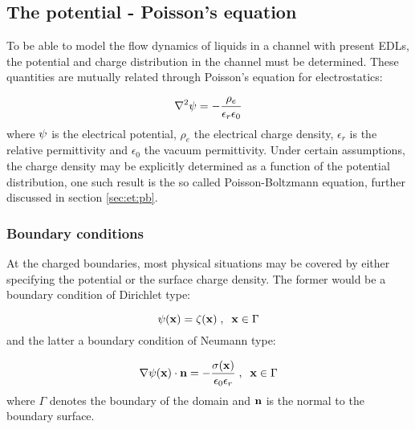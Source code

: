 \subsection{The potential - Poisson's equation}\label{sec:et:poisson}
To be able to model the flow dynamics of liquids in a channel with
present EDLs, the potential and charge distribution
in the channel must be determined. These quantities are mutually
related through Poisson's equation for electrostatics:

\begin{equation}\label{eq:pb}
\nabla^2\mathrm{\psi} = -\frac{\rho_e}{\epsilon_r \epsilon_0}
\end{equation}
where $\mathrm{\psi}$ is the electrical potential, $\rho_e$ the electrical
charge density, $\epsilon_r$ is the relative permittivity and
$\epsilon_0$ the vacuum permittivity. Under certain assumptions, the
charge density may be explicitly determined as a function of the
potential distribution, one such result is the so called
Poisson-Boltzmann equation, further discussed in section \ref{sec:et:pb}.

\subsubsection{Boundary conditions}
At the charged boundaries, most physical situations may be covered by
either specifying the potential or the surface charge density. The
former would be a boundary condition of Dirichlet type:

\begin{equation}
\mathrm{\psi}(\mathbf{x}) = \zeta(\mathbf{x})\;,\;\; \mathbf{x} \in \Gamma
\end{equation}
and the latter a boundary condition of Neumann type:

\begin{equation}\label{eq:et:fix_c}
\nabla\mathrm{\psi}(\mathbf{x}) \cdot \mathbf{n} =
-\frac{\sigma(\mathbf{x})}{\epsilon_0\epsilon_r}\;,\;\; \mathbf{x} \in \Gamma
\end{equation}
where $\Gamma$ denotes the boundary of the domain and $\mathbf{n}$ is the
normal to the boundary surface.\- \cite{hlushkou}
